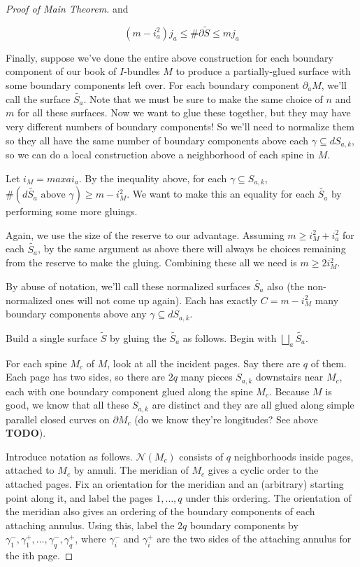 \documentclass[12pt]{amsart}
\theoremstyle{definition}
\theoremstyle{remark}
\newcommand{\bd}{\partial}
\newcommand{\cin}{\subseteq}
\newcommand{\cN}{\mathcal{N}}
\begin{document}
\begin{proof}[Proof of Main Theorem]
and

\[ (m-i_a^2)j_a \leq \#\bd\widetilde{S} \leq mj_a \]

Finally, suppose we've done the entire above construction for each boundary
component of our book of $I$-bundles $M$ to produce a partially-glued surface
with some boundary components left over. For each boundary component $\bd_aM$,
we'll call the surface $\widetilde{S_a}$. Note that we must be sure to make the same
choice of $n$ and $m$ for all these surfaces. Now we want to glue these
together, but they may have very different numbers of boundary components! So
we'll need to normalize them so they all have the same number of boundary
components above each $\gamma \cin dS_{a,k}$, so we can do a local construction
above a neighborhood of each spine in $M$.

Let $i_M = max a i_a$. By the inequality above, for each $\gamma \cin S_{a,k}$,
$\#(d\widetilde{S_a} \text{ above } \gamma) \geq m - i_M^2$. We want to make
this an equality for each $\widetilde{S_a}$ by performing some more gluings.

Again, we use the size of the reserve to our advantage. Assuming $m\geq i_M^2
+ i_a^2$ for each $\widetilde{S_a}$, by the same argument as above there will
always be choices remaining from the reserve to make the gluing. Combining
these all we need is $m\geq 2i_M^2$.

By abuse of notation, we'll call these normalized surfaces $\widetilde{S_a}$ also (the
non-normalized ones will not come up again). Each has exactly $C = m - i_M^2$
many boundary components above any $\gamma \cin dS_{a,k}$.

Build a single surface $\widetilde{S}$ by gluing the $\widetilde{S_a}$ as follows. Begin with
$\bigsqcup_a \widetilde{S_a}$.

For each spine $M_c$ of $M$, look at all the incident pages. Say there are $q$
of them.  Each page has two sides, so there are $2q$ many pieces $S_{a,k}$
downstairs near $M_c$, each with one boundary component glued along the spine
$M_c$.  Because $M$ is good, we know that all these $S_{a,k}$ are distinct and
they are all glued along simple parallel closed curves on $\bd M_c$ (do we know
they're longitudes?  See above \textbf{ TODO}).

Introduce notation as follows. $\cN(M_c)$ consists of $q$ neighborhoods inside
pages, attached to $M_c$ by annuli. The meridian of $M_c$ gives a cyclic order to
the attached pages.  Fix an orientation for the meridian and an (arbitrary)
starting point along it, and label the pages $1, \dots, q$ under this ordering.
The orientation of the meridian also gives an ordering of the boundary
components of each attaching annulus.  Using this, label the $2q$ boundary
components by $\gamma_1^-,\gamma_1^+,\dots, \gamma_q^-,\gamma_q^+$, where
$\gamma_i^-$ and $\gamma_i^+$ are the two sides of the attaching annulus for
the ith page.


\end{proof}
\end{document}
